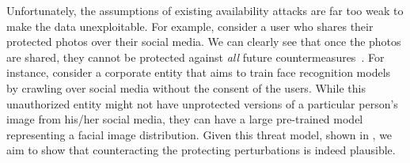 \documentclass[conference]{IEEEtran}
\theoremstyle{definition}
\theoremstyle{remark}
\theoremstyle{proposition}
\begin{document}
Unfortunately, the assumptions of existing availability attacks are far too weak to make the data unexploitable.
For example, consider a user who shares their protected photos over their social media.
We can clearly see that once the photos are shared, they cannot be protected against \textit{all} future countermeasures~\citep{dixit2022data}.
For instance, consider a corporate entity that aims to train face recognition models by crawling over social media without the consent of the users.
While this unauthorized entity might not have unprotected versions of a particular person's image from his/her social media, they can have a large pre-trained model representing a facial image distribution.
Given this threat model, shown in , we aim to show that counteracting the protecting perturbations is indeed plausible.
\end{document}
